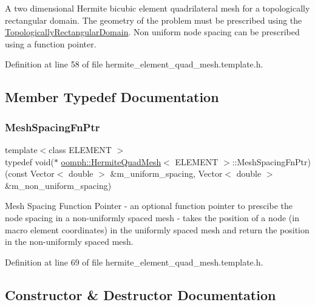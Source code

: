 A two dimensional Hermite bicubic element quadrilateral mesh for a topologically rectangular domain. The geometry of the problem must be prescribed using the \hyperlink{classoomph_1_1TopologicallyRectangularDomain}{Topologically\+Rectangular\+Domain}. Non uniform node spacing can be prescribed using a function pointer. 

Definition at line 58 of file hermite\+\_\+element\+\_\+quad\+\_\+mesh.\+template.\+h.



\subsection{Member Typedef Documentation}
\mbox{\label{classoomph_1_1HermiteQuadMesh_abebf4806b300591f976398404ed0ef3f}} 
\subsubsection{\texorpdfstring{Mesh\+Spacing\+Fn\+Ptr}{MeshSpacingFnPtr}}
{\footnotesize\ttfamily template$<$class E\+L\+E\+M\+E\+NT $>$ \\
typedef void($\ast$ \hyperlink{classoomph_1_1HermiteQuadMesh}{oomph\+::\+Hermite\+Quad\+Mesh}$<$ E\+L\+E\+M\+E\+NT $>$\+::Mesh\+Spacing\+Fn\+Ptr) (const Vector$<$ double $>$ \&m\+\_\+uniform\+\_\+spacing, Vector$<$ double $>$ \&m\+\_\+non\+\_\+uniform\+\_\+spacing)}



Mesh Spacing Function Pointer -\/ an optional function pointer to prescibe the node spacing in a non-\/uniformly spaced mesh -\/ takes the position of a node (in macro element coordinates) in the uniformly spaced mesh and return the position in the non-\/uniformly spaced mesh. 



Definition at line 69 of file hermite\+\_\+element\+\_\+quad\+\_\+mesh.\+template.\+h.



\subsection{Constructor \& Destructor Documentation}
\mbox{\label{classoomph_1_1HermiteQuadMesh_aea2e2144668d092f4e358f195bbc74e7}} 
